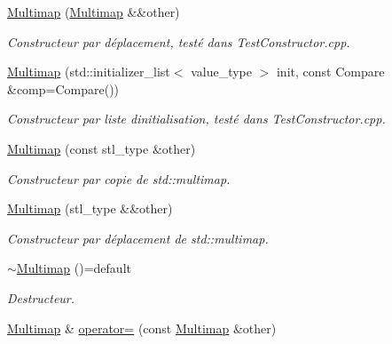 \begin{DoxyCompactItemize}
\hyperlink{classMultimap_aa3f51fa1d077ccbfa1c748ebf80157c2}{Multimap} (\hyperlink{classMultimap}{Multimap} \&\&other)
\begin{DoxyCompactList}\small\item\em Constructeur par déplacement, testé dans Test\+Constructor.\+cpp. \end{DoxyCompactList}\item 
\mbox{\label{classMultimap_a2bb5eb1ee2f11f05f951d6b0677ea3d7}} 
\hyperlink{classMultimap_a2bb5eb1ee2f11f05f951d6b0677ea3d7}{Multimap} (std\+::initializer\+\_\+list$<$ value\+\_\+type $>$ init, const Compare \&comp=Compare())
\begin{DoxyCompactList}\small\item\em Constructeur par liste d\textquotesingle{}initialisation, testé dans Test\+Constructor.\+cpp. \end{DoxyCompactList}\item 
\mbox{\label{classMultimap_a99e84047761c033582cc928287fdb3be}} 
\hyperlink{classMultimap_a99e84047761c033582cc928287fdb3be}{Multimap} (const stl\+\_\+type \&other)
\begin{DoxyCompactList}\small\item\em Constructeur par copie de std\+::multimap. \end{DoxyCompactList}\item 
\mbox{\label{classMultimap_af0f32de8dd8717d521570941dbaf2edb}} 
\hyperlink{classMultimap_af0f32de8dd8717d521570941dbaf2edb}{Multimap} (stl\+\_\+type \&\&other)
\begin{DoxyCompactList}\small\item\em Constructeur par déplacement de std\+::multimap. \end{DoxyCompactList}\item 
\mbox{\label{classMultimap_a3927ca00ca8f9363c3c73353c124348a}} 
\hyperlink{classMultimap_a3927ca00ca8f9363c3c73353c124348a}{$\sim$\+Multimap} ()=default
\begin{DoxyCompactList}\small\item\em Destructeur. \end{DoxyCompactList}\item 
\mbox{\label{classMultimap_a7624e69dbffb0df3e8f5010440060912}} 
\hyperlink{classMultimap}{Multimap} \& \hyperlink{classMultimap_a7624e69dbffb0df3e8f5010440060912}{operator=} (const \hyperlink{classMultimap}{Multimap} \&other)

\end{DoxyCompactItemize}
